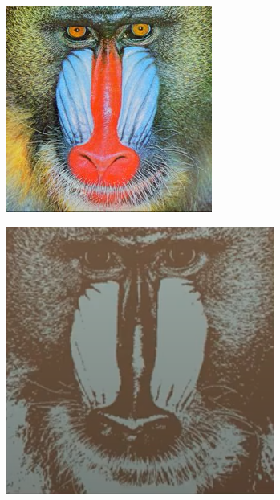 \begin{figure}[h!]
     \centering
     \begin{subfigure}[b]{0.4\textwidth}
         \centering
         \includegraphics[width=\textwidth]{img/scimmia.jpeg}
         \caption{}
         \label{}
     \end{subfigure}
     \hfill
     \begin{subfigure}[b]{0.4\textwidth}
         \centering
         \includegraphics[width=\textwidth]{img/scimmia_k=2.png}

\end{subfigure}
\end{figure}
